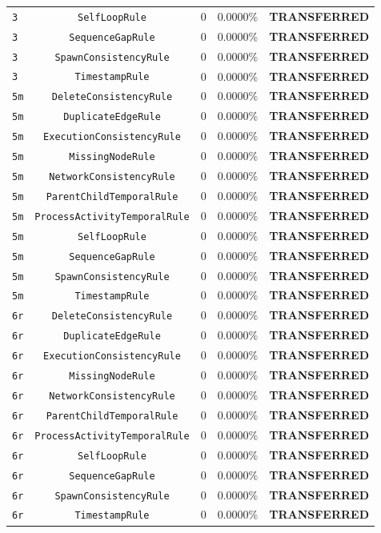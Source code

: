 \begin{table}[t]
\begin{tabular}{lcccc}
\texttt{3} & \texttt{SelfLoopRule} & 0 & 0.0000\% & \textbf{TRANSFERRED} \\
\texttt{3} & \texttt{SequenceGapRule} & 0 & 0.0000\% & \textbf{TRANSFERRED} \\
\texttt{3} & \texttt{SpawnConsistencyRule} & 0 & 0.0000\% & \textbf{TRANSFERRED} \\
\texttt{3} & \texttt{TimestampRule} & 0 & 0.0000\% & \textbf{TRANSFERRED} \\
\texttt{5m} & \texttt{DeleteConsistencyRule} & 0 & 0.0000\% & \textbf{TRANSFERRED} \\
\texttt{5m} & \texttt{DuplicateEdgeRule} & 0 & 0.0000\% & \textbf{TRANSFERRED} \\
\texttt{5m} & \texttt{ExecutionConsistencyRule} & 0 & 0.0000\% & \textbf{TRANSFERRED} \\
\texttt{5m} & \texttt{MissingNodeRule} & 0 & 0.0000\% & \textbf{TRANSFERRED} \\
\texttt{5m} & \texttt{NetworkConsistencyRule} & 0 & 0.0000\% & \textbf{TRANSFERRED} \\
\texttt{5m} & \texttt{ParentChildTemporalRule} & 0 & 0.0000\% & \textbf{TRANSFERRED} \\
\texttt{5m} & \texttt{ProcessActivityTemporalRule} & 0 & 0.0000\% & \textbf{TRANSFERRED} \\
\texttt{5m} & \texttt{SelfLoopRule} & 0 & 0.0000\% & \textbf{TRANSFERRED} \\
\texttt{5m} & \texttt{SequenceGapRule} & 0 & 0.0000\% & \textbf{TRANSFERRED} \\
\texttt{5m} & \texttt{SpawnConsistencyRule} & 0 & 0.0000\% & \textbf{TRANSFERRED} \\
\texttt{5m} & \texttt{TimestampRule} & 0 & 0.0000\% & \textbf{TRANSFERRED} \\
\texttt{6r} & \texttt{DeleteConsistencyRule} & 0 & 0.0000\% & \textbf{TRANSFERRED} \\
\texttt{6r} & \texttt{DuplicateEdgeRule} & 0 & 0.0000\% & \textbf{TRANSFERRED} \\
\texttt{6r} & \texttt{ExecutionConsistencyRule} & 0 & 0.0000\% & \textbf{TRANSFERRED} \\
\texttt{6r} & \texttt{MissingNodeRule} & 0 & 0.0000\% & \textbf{TRANSFERRED} \\
\texttt{6r} & \texttt{NetworkConsistencyRule} & 0 & 0.0000\% & \textbf{TRANSFERRED} \\
\texttt{6r} & \texttt{ParentChildTemporalRule} & 0 & 0.0000\% & \textbf{TRANSFERRED} \\
\texttt{6r} & \texttt{ProcessActivityTemporalRule} & 0 & 0.0000\% & \textbf{TRANSFERRED} \\
\texttt{6r} & \texttt{SelfLoopRule} & 0 & 0.0000\% & \textbf{TRANSFERRED} \\
\texttt{6r} & \texttt{SequenceGapRule} & 0 & 0.0000\% & \textbf{TRANSFERRED} \\
\texttt{6r} & \texttt{SpawnConsistencyRule} & 0 & 0.0000\% & \textbf{TRANSFERRED} \\
\texttt{6r} & \texttt{TimestampRule} & 0 & 0.0000\% & \textbf{TRANSFERRED} \\
\bottomrule
\end{tabular}
\end{table}

